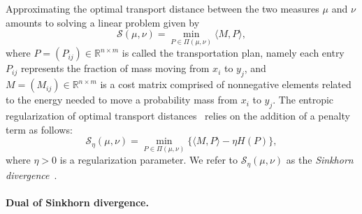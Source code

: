 \documentclass{article}
\newcommand{\inr}[1]{\langle #1 \rangle}
\newcommand{\R}{{\mathbb{R}}}
\begin{document}
Approximating the optimal transport distance between the two measures $\mu$ and $\nu$  amounts to solving a linear problem given by~\cite{kantorovich1942}
\begin{equation}
  \label{monge-kantorovich}
  \mathcal{S}(\mu, \nu) =  \min_{P\in \Pi(\mu, \nu)} \inr{M, P},
\end{equation}
where $P= (P_{ij}) \in \R^{n\times m}$ is called the transportation plan, namely each entry $P_{ij}$ represents the fraction of mass moving from $x_i$ to $y_j$, and $M= (M_{ij}) \in \R^{n\times m}$ is a cost matrix comprised of nonnegative elements related to the energy needed to move a probability mass from $x_i$ to $y_j$. 
The entropic regularization of optimal transport distances~\citep{cuturinips13} relies on the addition of a penalty term as follows:
\begin{equation}
\label{sinkhorn-primal}
  \mathcal{S}_\eta(\mu, \nu) =  \min_{P\in \Pi(\mu, \nu)} \{\inr{M, P} - \eta H(P)\},
\end{equation}
where $\eta > 0$ is a regularization parameter. We refer to $\mathcal{S}_\eta(\mu, \nu) $ as the \emph{Sinkhorn divergence}~\citep{cuturinips13}.

\paragraph{Dual of Sinkhorn divergence.}
\end{document}
